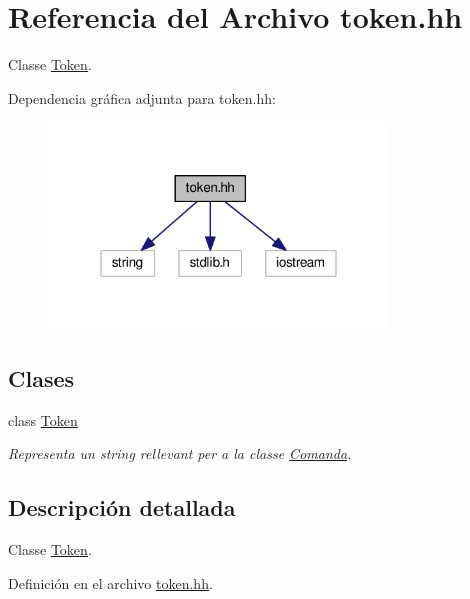\hypertarget{token_8hh}{\section{Referencia del Archivo token.\-hh}
\label{token_8hh}
}


Classe \hyperlink{class_token}{Token}.  


Dependencia gráfica adjunta para token.\-hh\-:\nopagebreak
\begin{figure}[H]
\begin{center}
\leavevmode
\includegraphics[width=256pt]{token_8hh__incl}
\end{center}
\end{figure}
\subsection*{Clases}
\begin{DoxyCompactItemize}
\item 
class \hyperlink{class_token}{Token}
\begin{DoxyCompactList}\small\item\em Representa un string rellevant per a la classe \hyperlink{class_comanda}{Comanda}. \end{DoxyCompactList}\end{DoxyCompactItemize}


\subsection{Descripción detallada}
Classe \hyperlink{class_token}{Token}. 

Definición en el archivo \hyperlink{token_8hh_source}{token.\-hh}.

